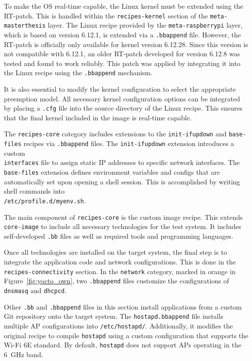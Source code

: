 To make the \ac{OS} real-time capable, the Linux kernel must be extended using the RT-patch.  
This is handled within the \texttt{recipes-kernel} section of the \texttt{meta-masterthesis} layer.  
The Linux recipe provided by the \texttt{meta-raspberrypi} layer, which is based on version 6.12.1, is extended via a \texttt{.bbappend} file.  
However, the RT-patch is officially only available for kernel version 6.12.28.  
Since this version is not compatible with 6.12.1, an older RT-patch developed for version 6.12.8 was tested and found to work reliably.  
This patch was applied by integrating it into the Linux recipe using the \texttt{.bbappend} mechanism.

It is also essential to modify the kernel configuration to select the appropriate preemption model.  
All necessary kernel configuration options can be integrated by placing a \texttt{.cfg} file into the source directory of the Linux recipe.  
This ensures that the final kernel included in the image is real-time capable.

The \texttt{recipes-core} category includes extensions to the \texttt{init-ifupdown} and \texttt{base-files} recipes via \texttt{.bbappend} files.  
The \texttt{init-ifupdown} extension introduces a custom \\
\texttt{interfaces} file to assign static IP addresses to specific network interfaces.  
The \texttt{base-files} extension defines environment variables and configs that are automatically set upon opening a shell session.  
This is accomplished by writing shell commands into \\
\texttt{/etc/profile.d/myenv.sh}.  

The main component of \texttt{recipes-core} is the custom image recipe.  
This extends\\
\texttt{core-image} to include all necessary technologies for the test system.  
It includes self-developed \texttt{.bb} files as well as required tools and programming languages.

Once all technologies are installed on the target system, the final step is to integrate the application code and network configurations.  
This is done in the \texttt{recipes-connectivity} section.  
In the \texttt{network} category, marked in orange in Figure~\ref{fig:yocto_own}, two \texttt{.bbappend} files customize the configurations of \texttt{dnsmasq} and \texttt{dhcpcd}.  

Other \texttt{.bb} and \texttt{.bbappend} files in this section install applications from a custom Git repository onto the target system.  
The \texttt{hostapd.bbappend} file installs multiple \ac{AP} configurations into \texttt{/etc/hostapd/}.  
Additionally, it modifies the original recipe to compile \texttt{hostapd} using a custom configuration that supports the Wi-Fi 6E standard.  
By default, \texttt{hostapd} does not support \acp{AP}  operating in the 6~GHz band.  

